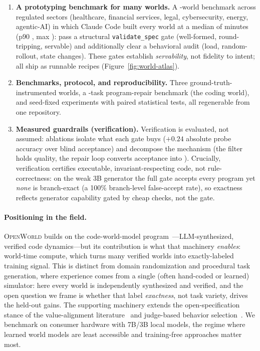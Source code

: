 \documentclass[11pt]{article}
\newcommand{\openworld}{\textsc{OpenWorld}}
\begin{document}
\begin{enumerate}
  the \emph{many} worlds world-time compute needs practical.
  \item \textbf{A prototyping benchmark for many worlds.} A \ProtoNumWorlds-world benchmark
  across \ProtoNumSectors{} regulated sectors (healthcare, financial services, legal,
  cybersecurity, energy, agentic-AI) in which Claude Code built every world at a median of
  \ProtoMedianMinutes{} minutes (p90 \ProtoPNinetyMinutes, max \ProtoMaxMinutes):
  \ProtoValidationRate{} pass a structural \texttt{validate\_spec} gate (well-formed,
  round-tripping, servable) and \ProtoExecutableRate{} additionally clear a behavioral
  audit (load, random-rollout, state changes). These gates establish \emph{servability},
  not fidelity to intent; all \ProtoNumWorlds{} ship as runnable recipes
  (Figure~\ref{fig:world-atlas}).
  \item \textbf{Benchmarks, protocol, and reproducibility.} Three
  ground-truth-instrumented worlds, a \NumTasks-task program-repair benchmark (the coding
  world), and \NumExperiments{} seed-fixed experiments with paired statistical tests, all
  regenerable from one repository.
  \item \textbf{Measured guardrails (verification).} Verification is evaluated, not
  assumed: ablations isolate what each gate buys ($+0.24$ absolute probe accuracy over
  blind acceptance) and decompose the mechanism (the filter holds quality, the repair loop
  converts \FilterAccept{} acceptance into \LoopAccept). Crucially, verification certifies
  executable, invariant-respecting code, not rule-correctness: on the weak 3B generator the
  full gate accepts every program yet \emph{none} is branch-exact (a 100\% branch-level
  false-accept rate), so exactness reflects generator capability gated by cheap checks, not
  the gate.
\end{enumerate}

\paragraph{Positioning in the field.} \openworld{} builds on the code-world-model
program~\cite{worldcoder2024,cwmgames2025}---LLM-synthesized, verified code
dynamics---but its contribution is what that machinery \emph{enables}: world-time compute,
which turns many verified worlds into exactly-labeled training signal. This is distinct from
domain randomization and procedural task generation, where experience comes from a single
(often hand-coded or learned) simulator: here every world is independently synthesized and
verified, and the open question we frame is whether that label \emph{exactness}, not task
variety, drives the held-out gains. The supporting machinery extends the open-specification
stance of the value-alignment literature~\cite{spectrap2025,mas2025} and judge-based
behavior selection~\cite{agentasjudge2024}. We benchmark on consumer hardware with 7B/3B
local models, the regime where learned world models are least accessible and training-free
approaches matter most.
\end{document}
